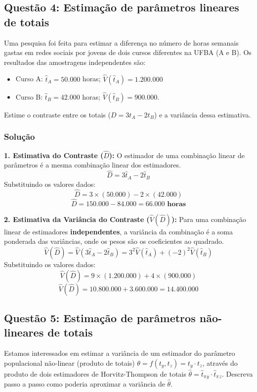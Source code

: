 \documentclass{article}
\begin{document}
\hrulefill
\subsection*{Questão 4: Estimação de parâmetros lineares de totais}
Uma pesquisa foi feita para estimar a diferença no número de horas semanais gastas em redes sociais por jovens de dois cursos diferentes na UFBA (A e B). Os resultados das amostragens independentes são:
\begin{itemize}   
\item Curso A: \(\widehat{t}_A = 50.000\) horas; \(\widehat{V}(\widehat{t}_A) = 1.200.000\)
\item Curso B: \(\widehat{t}_B = 42.000\) horas; \(\widehat{V}(\widehat{t}_B) = 900.000\).
\end{itemize}
Estime o contraste entre os totais (\(D = 3 t_A - 2 t_B\)) e a variância dessa estimativa.

\subsubsection*{Solução}
\textbf{1. Estimativa do Contraste ($\hat{D}$):}
O estimador de uma combinação linear de parâmetros é a mesma combinação linear dos estimadores.
\[ \hat{D} = 3 \hat{t}_A - 2 \hat{t}_B \]
Substituindo os valores dados:
\[ \hat{D} = 3 \times (50.000) - 2 \times (42.000) \]
\[ \hat{D} = 150.000 - 84.000 = \mathbf{66.000 \textbf{ horas}} \]

\textbf{2. Estimativa da Variância do Contraste ($\hat{V}(\hat{D})$):}
Para uma combinação linear de estimadores \textbf{independentes}, a variância da combinação é a soma ponderada das variâncias, onde os pesos são os coeficientes ao quadrado.
\[ \hat{V}(\hat{D}) = \hat{V}(3 \hat{t}_A - 2 \hat{t}_B) = 3^2 \hat{V}(\hat{t}_A) + (-2)^2 \hat{V}(\hat{t}_B) \]
Substituindo os valores dados:
\[ \hat{V}(\hat{D}) = 9 \times (1.200.000) + 4 \times (900.000) \]
\[ \hat{V}(\hat{D}) = 10.800.000 + 3.600.000 = \mathbf{14.400.000} \]

\hrulefill
\subsection*{Questão 5: Estimação de parâmetros não-lineares de totais}
Estamos interessados em estimar a variância de um estimador do parâmetro populacional não-linear (produto de totais) $\theta=f(t_y,t_z)=t_y\cdot t_z$, através do produto de dois estimadores de Horvitz-Thompson de totais $\widehat{\theta} = {\widehat{t}_\pi}{_y} \cdot {\widehat{t}_\pi}{_z}$. Descreva passo a passo como poderia aproximar a variância de $\hat{\theta}$.
\end{document}

